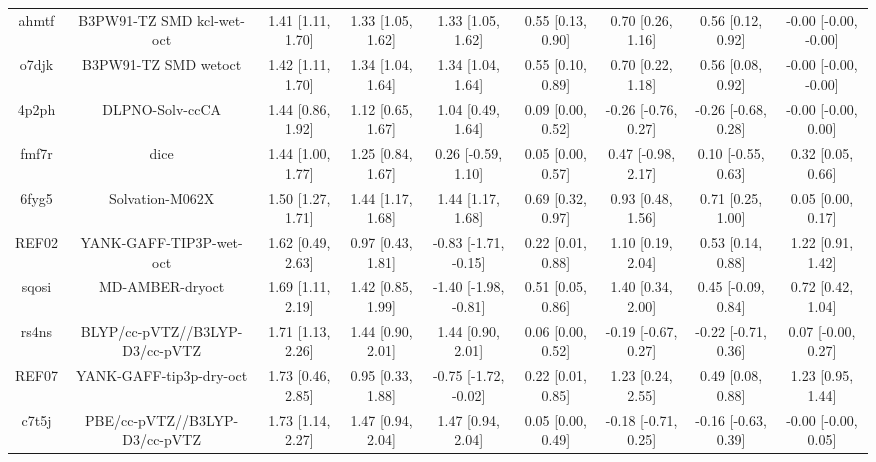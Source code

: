 \documentclass{article}
\begin{document}
\begin{center}
\begin{longtable}{|ccccccccc|}
 ahmtf &                          B3PW91-TZ SMD kcl-wet-oct &  1.41 [1.11, 1.70] &  1.33 [1.05, 1.62] &     1.33 [1.05, 1.62] &  0.55 [0.13, 0.90] &    0.70 [0.26, 1.16] &    0.56 [0.12, 0.92] &  -0.00 [-0.00, -0.00] \\
 o7djk &                               B3PW91-TZ SMD wetoct &  1.42 [1.11, 1.70] &  1.34 [1.04, 1.64] &     1.34 [1.04, 1.64] &  0.55 [0.10, 0.89] &    0.70 [0.22, 1.18] &    0.56 [0.08, 0.92] &  -0.00 [-0.00, -0.00] \\
 4p2ph &                                    DLPNO-Solv-ccCA &  1.44 [0.86, 1.92] &  1.12 [0.65, 1.67] &     1.04 [0.49, 1.64] &  0.09 [0.00, 0.52] &  -0.26 [-0.76, 0.27] &  -0.26 [-0.68, 0.28] &   -0.00 [-0.00, 0.00] \\
 fmf7r &                                               dice &  1.44 [1.00, 1.77] &  1.25 [0.84, 1.67] &    0.26 [-0.59, 1.10] &  0.05 [0.00, 0.57] &   0.47 [-0.98, 2.17] &   0.10 [-0.55, 0.63] &     0.32 [0.05, 0.66] \\
 6fyg5 &                                    Solvation-M062X &  1.50 [1.27, 1.71] &  1.44 [1.17, 1.68] &     1.44 [1.17, 1.68] &  0.69 [0.32, 0.97] &    0.93 [0.48, 1.56] &    0.71 [0.25, 1.00] &     0.05 [0.00, 0.17] \\
 REF02 &                            YANK-GAFF-TIP3P-wet-oct &  1.62 [0.49, 2.63] &  0.97 [0.43, 1.81] &  -0.83 [-1.71, -0.15] &  0.22 [0.01, 0.88] &    1.10 [0.19, 2.04] &    0.53 [0.14, 0.88] &     1.22 [0.91, 1.42] \\
 sqosi &                                    MD-AMBER-dryoct &  1.69 [1.11, 2.19] &  1.42 [0.85, 1.99] &  -1.40 [-1.98, -0.81] &  0.51 [0.05, 0.86] &    1.40 [0.34, 2.00] &   0.45 [-0.09, 0.84] &     0.72 [0.42, 1.04] \\
 rs4ns &                     BLYP/cc-pVTZ//B3LYP-D3/cc-pVTZ &  1.71 [1.13, 2.26] &  1.44 [0.90, 2.01] &     1.44 [0.90, 2.01] &  0.06 [0.00, 0.52] &  -0.19 [-0.67, 0.27] &  -0.22 [-0.71, 0.36] &    0.07 [-0.00, 0.27] \\
 REF07 &                            YANK-GAFF-tip3p-dry-oct &  1.73 [0.46, 2.85] &  0.95 [0.33, 1.88] &  -0.75 [-1.72, -0.02] &  0.22 [0.01, 0.85] &    1.23 [0.24, 2.55] &    0.49 [0.08, 0.88] &     1.23 [0.95, 1.44] \\
 c7t5j &                      PBE/cc-pVTZ//B3LYP-D3/cc-pVTZ &  1.73 [1.14, 2.27] &  1.47 [0.94, 2.04] &     1.47 [0.94, 2.04] &  0.05 [0.00, 0.49] &  -0.18 [-0.71, 0.25] &  -0.16 [-0.63, 0.39] &   -0.00 [-0.00, 0.05] \\

\end{longtable}
\end{center}
\end{document}
